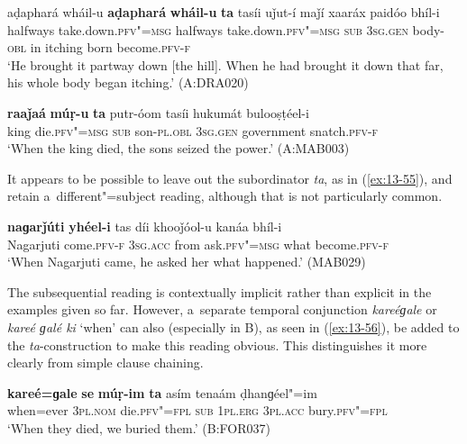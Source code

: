 \largerpage
\begin{exe}
\ex
\label{ex:13-53}
\gll aḍaphará wháil-u \textbf{aḍaphará} \textbf{wháil-u} \textbf{ta} tasíi uǰut-í maǰí xaaráx paidóo bhíl-i \\
halfways take.down.\textsc{pfv"=msg} halfways  take.down.\textsc{pfv"=msg } \textsc{sub} \textsc{3sg.gen} body-\textsc{obl} in itching born become.\textsc{pfv-f} \\
\glt `He brought it partway down [the hill]. When he had brought it down that far, his whole body began itching.' (A:DRA020)

\ex
\label{ex:13-54}
\gll \textbf{raaǰaá} \textbf{múṛ-u} \textbf{ta} putr-óom tasíi hukumát bulooṣṭéel-i \\
king die.\textsc{pfv"=msg} \textsc{sub} son-\textsc{pl.obl} \textsc{3sg.gen}  government snatch.\textsc{pfv-f} \\
\glt `When the king died, the sons seized the power.' (A:MAB003)
\end{exe}

It appears to be possible to leave out the subordinator \textit{ta}, as in (\ref{ex:13-55}), and retain a~different"=subject reading, although that is not particularly common.

\begin{exe}
\ex
\label{ex:13-55}
\gll \textbf{naɡarǰúti} \textbf{yhéel-i} tas díi khooǰóol-u kanáa bhíl-i \\
Nagarjuti come.\textsc{pfv-f} \textsc{3sg.acc} from ask.\textsc{pfv"=msg}  what become.\textsc{pfv-f} \\
\glt `When Nagarjuti came, he asked her what happened.' (MAB029) 
\end{exe}

The subsequential reading is contextually implicit rather than explicit in the examples given so far. However, a~separate temporal conjunction \textit{kareéɡale} or \textit{kareé ɡalé ki} `when' can also (especially in B), as seen in (\ref{ex:13-56}), be added to the \textit{ta}-construction to make this reading obvious. This distinguishes it more clearly from simple clause chaining.

\begin{exe}
\ex
\label{ex:13-56}
\gll \textbf{kareé=ɡale} \textbf{se} \textbf{múṛ-im} \textbf{ta} asím tenaám ḍhanɡéel"=im \\
when=ever \textsc{3pl.nom} die.\textsc{pfv"=fpl} \textsc{sub} \textsc{1pl.erg} \textsc{3pl.acc} bury.\textsc{pfv"=fpl} \\
\glt `When they died, we buried them.' (B:FOR037) 
\end{exe}

